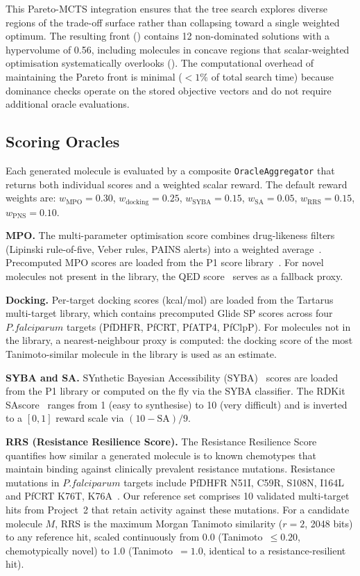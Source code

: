 \documentclass[jcim,article,layout=manuscript]{achemso}
\begin{document}
This Pareto-MCTS integration ensures that the tree search explores diverse
regions of the trade-off surface rather than collapsing toward a single
weighted optimum. The resulting front () contains 12
non-dominated solutions with a hypervolume of 0.56, including molecules
in concave regions that scalar-weighted optimisation systematically
overlooks (). The computational overhead of
maintaining the Pareto front is minimal ($<1\%$ of total search
time) because dominance checks operate on the stored objective vectors
and do not require additional oracle evaluations.

\subsection{Scoring Oracles}
\label{sec:oracles}

Each generated molecule is evaluated by a composite
\texttt{OracleAggregator} that returns both individual scores and a
weighted scalar reward. The default reward weights are:
$w_{\text{MPO}}=0.30$, $w_{\text{docking}}=0.25$,
$w_{\text{SYBA}}=0.15$, $w_{\text{SA}}=0.05$,
$w_{\text{RRS}}=0.15$, $w_{\text{PNS}}=0.10$.

\textbf{MPO.} The multi-parameter optimisation score combines drug-likeness
filters (Lipinski rule-of-five, Veber rules, PAINS alerts) into a weighted
average~\cite{Wager2010}. Precomputed MPO scores are loaded from the P1
score library~\cite{Temgoua2026a}. For novel molecules not present in the
library, the QED score~\cite{Bickerton2012} serves as a fallback proxy.

\textbf{Docking.} Per-target docking scores (kcal/mol) are loaded from the
Tartarus multi-target library, which contains precomputed Glide SP scores
across four $P. falciparum$ targets (PfDHFR, PfCRT, PfATP4, PfClpP).
For molecules not in the library, a nearest-neighbour proxy is computed:
the docking score of the most Tanimoto-similar molecule in the library is
used as an estimate.

\textbf{SYBA and SA.} SYnthetic Bayesian Accessibility (SYBA)~
\cite{Vorsilak2020} scores are loaded from the P1 library or computed on
the fly via the SYBA classifier. The RDKit SAscore~\cite{Ertl2009} ranges
from 1 (easy to synthesise) to 10 (very difficult) and is inverted to a
$[0,1]$ reward scale via $(10 - \text{SA})/9$.

\textbf{RRS (Resistance Resilience Score).} The Resistance Resilience
Score quantifies how similar a generated molecule is to known chemotypes
that maintain binding against clinically prevalent resistance mutations.
Resistance mutations in $P. falciparum$ targets include PfDHFR N51I,
C59R, S108N, I164L and PfCRT K76T, K76A~\cite{Wicht2024}. Our reference
set comprises 10 validated multi-target hits from Project~2 that retain
activity against these mutations. For a candidate molecule $M$, RRS is
the maximum Morgan Tanimoto similarity ($r=2$, 2048 bits) to any
reference hit, scaled continuously from 0.0 (Tanimoto~$\leq 0.20$,
chemotypically novel) to 1.0 (Tanimoto~$= 1.0$, identical to a
resistance-resilient hit).
\end{document}
